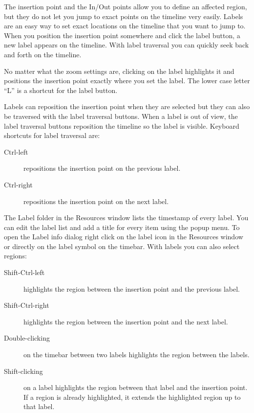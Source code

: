 The insertion point and the In/Out points allow you to define an affected region, but they do not let you jump to exact points on the timeline very easily. 
Labels are an easy way to set exact locations on the timeline that you want to jump to. 
When you position the insertion point somewhere and click the label button, a new label appears on the timeline. 
With label traversal you can quickly seek back and forth on the timeline.

No matter what the zoom settings are, clicking on the label highlights it and positions the insertion point exactly where you set the label. 
The lower case letter “L” is a shortcut for the label button.

Labels can reposition the insertion point when they are selected but they can also be traversed with the label traversal buttons. When a label is out of view, the label traversal buttons reposition the timeline so the label is visible. Keyboard shortcuts for label traversal are:

\begin{description}
    \item[Ctrl-left] repositions the insertion point on the previous label.
    \item[Ctrl-right] repositions the insertion point on the next label.
\end{description}

The Label folder in the Resources window lists the timestamp of every label. 
You can edit the label list and add a title for every item using the popup menu. 
To open the Label info dialog right click on the label icon in the Resources window or directly on the label symbol on the timebar. 
With labels you can also select regions:

\begin{description}
    \item[Shift-Ctrl-left] highlights the region between the insertion point and the previous label.
    \item[Shift-Ctrl-right] highlights the region between the insertion point and the next label.
    \item[Double-clicking] on the timebar between two labels highlights the region between the labels.	   
    \item[Shift-clicking] on a label highlights the region between that label and the insertion point.
        If a region is already highlighted, it extends the highlighted region up to that label.
\end{description}



